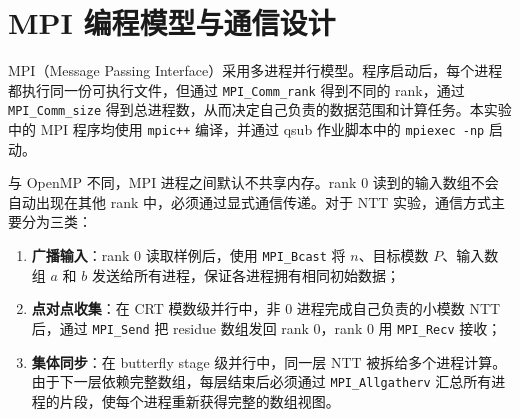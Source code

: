 \documentclass[a4paper]{article}
\begin{document}
\begin{table}[H]
  \centering
  \caption{MPI NTT 五个版本说明}
  \label{tab:versions}
\end{table}

\section{MPI 编程模型与通信设计}

MPI（Message Passing Interface）采用多进程并行模型。程序启动后，每个进程都执行同一份可执行文件，但通过 \texttt{MPI\_Comm\_rank} 得到不同的 rank，通过 \texttt{MPI\_Comm\_size} 得到总进程数，从而决定自己负责的数据范围和计算任务。本实验中的 MPI 程序均使用 \texttt{mpic++} 编译，并通过 qsub 作业脚本中的 \texttt{mpiexec -np} 启动。

与 OpenMP 不同，MPI 进程之间默认不共享内存。rank 0 读到的输入数组不会自动出现在其他 rank 中，必须通过显式通信传递。对于 NTT 实验，通信方式主要分为三类：
\begin{enumerate}
    \item \textbf{广播输入}：rank 0 读取样例后，使用 \texttt{MPI\_Bcast} 将 $n$、目标模数 $P$、输入数组 $a$ 和 $b$ 发送给所有进程，保证各进程拥有相同初始数据；
    \item \textbf{点对点收集}：在 CRT 模数级并行中，非 0 进程完成自己负责的小模数 NTT 后，通过 \texttt{MPI\_Send} 把 residue 数组发回 rank 0，rank 0 用 \texttt{MPI\_Recv} 接收；
    \item \textbf{集体同步}：在 butterfly stage 级并行中，同一层 NTT 被拆给多个进程计算。由于下一层依赖完整数组，每层结束后必须通过 \texttt{MPI\_Allgatherv} 汇总所有进程的片段，使每个进程重新获得完整的数组视图。
\end{enumerate}
\end{document}
